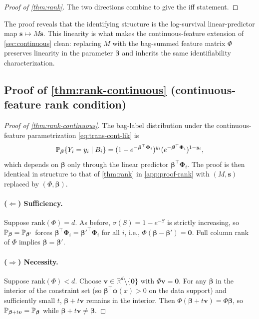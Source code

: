 \begin{proof}[Proof of \cref{thm:rank}]
The two directions combine to give the iff statement. \qedhere
\end{proof}

The proof reveals that the identifying structure is the log-survival
linear-predictor map $\bm s \mapsto M\bm s$. This linearity is
what makes the continuous-feature extension of \cref{sec:continuous}
clean: replacing $M$ with the bag-summed feature matrix $\Phi$
preserves linearity in the parameter $\bm\beta$ and inherits the
same identifiability characterization.

\subsection{Proof of \cref{thm:rank-continuous} (continuous-feature rank condition)}
\label{app:proof-cont-rank}

\begin{proof}[Proof of \cref{thm:rank-continuous}]
The bag-label distribution under the continuous-feature
parametrization \eqref{eq:trans-cont-lik} is
\begin{equation*}
  \mathbb{P}_{\bm\beta}\{Y_i = y_i \mid B_i\}
   = (1 - e^{-\bm\beta^\top \bm\Phi_i})^{y_i}
     (e^{-\bm\beta^\top \bm\Phi_i})^{1 - y_i},
\end{equation*}
which depends on $\bm\beta$ only through the linear predictor
$\bm\beta^\top \bm\Phi_i$. The proof is then identical in structure
to that of \cref{thm:rank} in \cref{app:proof-rank} with $(M, \bm s)$
replaced by $(\Phi, \bm\beta)$.

\paragraph{($\Leftarrow$) Sufficiency.}
Suppose $\mathrm{rank}(\Phi) = d$. As before, $\sigma(S) = 1 -
e^{-S}$ is strictly increasing, so $\mathbb{P}_{\bm\beta} =
\mathbb{P}_{\bm\beta'}$ forces $\bm\beta^\top \bm\Phi_i = \bm\beta'^\top
\bm\Phi_i$ for all $i$, i.e., $\Phi(\bm\beta - \bm\beta') = \bm 0$.
Full column rank of $\Phi$ implies $\bm\beta = \bm\beta'$.

\paragraph{($\Rightarrow$) Necessity.}
Suppose $\mathrm{rank}(\Phi) < d$. Choose $\bm v \in \mathbb{R}^d
\setminus \{\bm 0\}$ with $\Phi \bm v = \bm 0$. For any
$\bm\beta$ in the interior of the constraint set (so $\bm\beta^\top
\bm\phi(x) > 0$ on the data support) and sufficiently small $t$,
$\bm\beta + t\bm v$ remains in the interior. Then $\Phi(\bm\beta +
t\bm v) = \Phi\bm\beta$, so $\mathbb{P}_{\bm\beta + t\bm v} =
\mathbb{P}_{\bm\beta}$ while $\bm\beta + t\bm v \neq \bm\beta$.
\qedhere
\end{proof}

